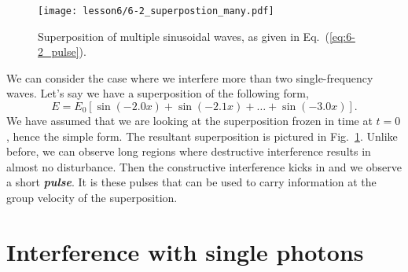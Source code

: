 




\begin{figure}[t]
   \centering
    \texttt{[image: lesson6/6-2\_superpostion\_many.pdf]}    
        \caption[Pulse]{Superposition of multiple sinusoidal waves, as given in Eq.~(\ref{eq:6-2_pulse}).}
        \label{fig:6-2_pulse}
\end{figure}
We can consider the case where we interfere more than two single-frequency waves.
Let's say we have a superposition of the following form,
\begin{equation}
    E = E_0 [\sin(-2.0x) + \sin(-2.1x) + \ldots + \sin(-3.0x)].
    \label{eq:6-2_pulse}
\end{equation}
We have assumed that we are looking at the superposition frozen in time at $t=0$, hence the simple form.
The resultant superposition is pictured in Fig.~\ref{fig:6-2_pulse}.
Unlike before, we can observe long regions where destructive interference results in almost no disturbance.
Then the constructive interference kicks in and we observe a short \textit{\textbf{pulse}}.
It is these pulses that can be used to carry information at the group velocity of the superposition.



\section{Interference with single photons}
\label{sec:6-4_interference_single_photons}

